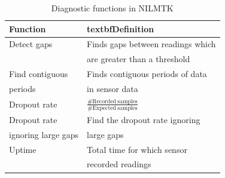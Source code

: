 \documentclass{sig-alternate}
\begin{document}
\begin{table}
    \small
    \begin{tabular}{ll}
    \hline
    \textbf{Function} & textbf{Definition} \\ \hline
    Detect gaps          & Finds gaps between readings which\\
                         & are greater than a threshold\\ \hline
    Find contiguous      & Finds contiguous periods of data\\
    periods              & in sensor data\\ \hline
    Dropout rate         & $\frac{\# \mathrm{Recorded~samples}}{\# \mathrm{Expected~samples}}$\\ \hline
    Dropout rate         & Find the dropout rate ignoring\\
    ignoring large gaps  & large gaps\\ \hline
    Uptime               & Total time for which sensor\\ 
                         & recorded readings\\ \hline
    
    
     
    \end{tabular}
    \caption{Diagnostic functions in NILMTK}
  \label{tab:diagnostic_functions}
\end{table}
\end{document}
